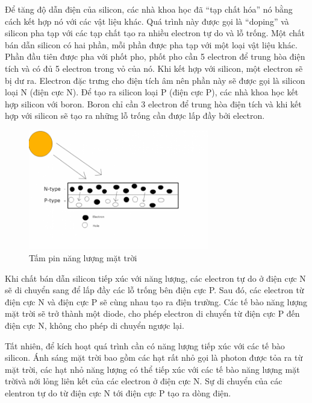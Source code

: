 Để tăng độ dẫn điện của silicon, các nhà khoa học đã “tạp chất hóa” nó bằng cách kết hợp nó với các vật liệu khác. Quá trình này được gọi là “doping” và silicon pha tạp với các tạp chất tạo ra nhiều electron tự do và lỗ trống. Một chất bán dẫn silicon có hai phần, mỗi phần được pha tạp với một loại vật liệu khác. Phần đầu tiên được pha với phốt pho, phốt pho cần 5 electron để trung hòa điện tích và có đủ 5 electron trong vỏ của nó. Khi kết hợp với silicon, một electron sẽ bị dư ra. Electron đặc trưng cho điện tích âm nên phần này sẽ được gọi là silicon loại N (điện cực N). Để tạo ra silicon loại P (điện cực P), các nhà khoa học kết hợp silicon với boron. Boron chỉ cần 3 electron để trung hòa điện tích và khi kết hợp với silicon sẽ tạo ra những lỗ trống cần được lấp đầy bởi electron.
\begin{figure}[H]
	\centering    
	\includegraphics[width=0.7\textwidth]{solarpanel_hinhthanhdientich}
	\caption[Tấm pin năng lượng mặt trời]{Tấm pin năng lượng mặt trời}
	\label{fig:solarpanel_hinhthanhdientich}
\end{figure}


Khi chất bán dẫn silicon tiếp xúc với năng lượng, các electron tự do ở điện cực N sẽ di chuyển sang để lấp đầy các lỗ trống bên điện cực P. Sau đó, các electron từ điện cực N và điện cực P sẽ cùng nhau tạo ra điện trường. Các tế bào năng lượng mặt trời sẽ trở thành một diode, cho phép electron di chuyển từ điện cực P đến điện cực N, không cho phép di chuyển ngược lại.

Tất nhiên, để kích hoạt quá trình cần có năng lượng tiếp xúc với các tế bào silicon. Ánh sáng mặt trời bao gồm các hạt rất nhỏ gọi là photon được tỏa ra từ mặt trời, các hạt nhỏ năng lượng có thể tiếp xúc với các tế bào năng lượng mặt trờivà nới lỏng liên kết của các electron ở điện cực N. Sự di chuyển của các elentron tự do từ điện cực N tới điện cực P tạo ra dòng điện.





